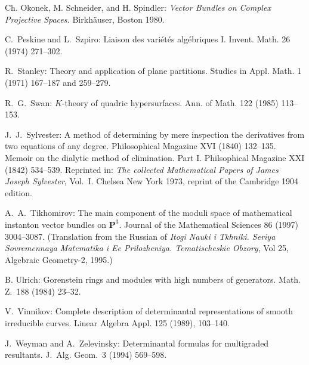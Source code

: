\documentclass{jams-l}
\theoremstyle{definition}
\theoremstyle{remark}
\begin{document}
\begin{thebibliography}{}
Ch. Okonek, M. Schneider, and H. Spindler: {\it Vector Bundles on
Complex Projective Spaces.} Birkh\"auser, Boston 1980.

C.~Peskine and L.~Szpiro: Liaison des vari\'et\'es alg\'ebriques I. 
Invent. Math. 26 (1974) 271--302.

R.~Stanley: Theory and application of plane partitions. Studies in
Appl. Math. 1 (1971) 167--187 and 259--279.

R.~G.~Swan: $K$-theory of quadric hypersurfaces. Ann. of Math.
122 (1985) 113--153.

J.~J.~Sylvester: A method of determining by mere inspection the derivatives from two 
equations of any degree. Philosophical Magazine XVI (1840) 132--135.
Memoir on the dialytic method of elimination. Part I. 
Philsophical Magazine XXI (1842) 534--539. Reprinted in:
{\it The collected Mathematical Papers of James Joseph Sylvester}, Vol.~I.
Chelsea New York 1973, reprint of the Cambridge 1904 edition.

A.~A.~Tikhomirov: The main component of the moduli space of 
mathematical instanton vector bundles on ${\mathbf P}^3$.
Journal of the Mathematical Sciences 86 (1997) 3004--3087.
(Translation from the Russian of {\it Itogi Nauki i Tkhniki.
Seriya Sovremennaya Matematika i Ee Prilozheniya. Tematischeskie Obzory},
Vol 25, Algebraic Geometry-2, 1995.)

B. Ulrich: Gorenstein rings and modules with high numbers of generators.
Math. Z.~188 (1984) 23--32.

V.~Vinnikov: Complete description of determinantal representations of
smooth irreducible curves. Linear Algebra Appl. 125 (1989), 103--140.

J.~Weyman and A.~Zelevinsky: Determinantal formulas for multigraded resultants.
J.~Alg. Geom.~3 (1994) 569--598.

\end{thebibliography}
\end{document}
